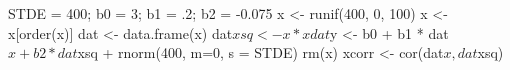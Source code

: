 \begin{Schunk}
\begin{Sinput}
 STDE = 400; b0 = 3; b1 = .2; b2 = -0.075
 x <- runif(400, 0, 100)
 x <- x[order(x)]
 dat <- data.frame(x)
 dat$xsq <- x*x
 dat$y <- b0 + b1 * dat$x + b2 * dat$xsq + rnorm(400, m=0, s = STDE)
 rm(x)
 xcorr <- cor(dat$x, dat$xsq)
\end{Sinput}
\end{Schunk}
